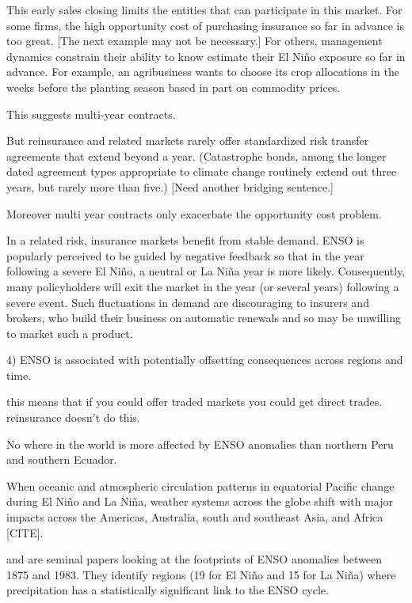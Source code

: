 \documentclass[authoryear]{article}
\begin{document}
This early sales closing limits the entities that can participate in this market. For some firms, the high opportunity cost of purchasing insurance so far in advance is too great. [The next example may not be necessary.] For others, management dynamics constrain their ability to know estimate their El Ni\~no exposure so far in advance. For example, an agribusiness wants to choose its crop allocations in the weeks before the planting season based in part on commodity prices.


This suggests multi-year contracts. 

But reinsurance and related markets rarely offer standardized risk transfer agreements that extend beyond a year. (Catastrophe bonds, among the longer dated agreement types appropriate to climate change routinely extend out three years, but rarely more than five.) [Need another bridging sentence.] 

Moreover multi year contracts only exacerbate the opportunity cost problem.


In a related risk, insurance markets benefit from stable demand. ENSO is popularly perceived to be guided by negative feedback so that in the year following a severe El Ni\~no, a neutral or La Ni\~na year is more likely. Consequently, many policyholders will exit the market in the year (or several years) following a severe event. Such fluctuations in demand are discouraging to insurers and brokers, who build their business on automatic renewals and so may be unwilling to market such a product.

4) ENSO is associated with potentially offsetting consequences across regions and time. 

this means that if you could offer traded markets you could get direct trades. reinsurance doesn't do this. 

No where in the world is more affected by ENSO anomalies than northern Peru and southern Ecuador.

When oceanic and atmospheric circulation patterns in equatorial Pacific change during El Ni\~no and La Ni\~na, weather systems across the globe shift with major impacts across the Americas, Australia, south and southeast Asia, and Africa [CITE].

\citet{ropelewski1987global} and \citet{ropelewski1989precipitation} are seminal papers looking at the footprints of ENSO anomalies between 1875 and 1983. They identify regions (19 for El Ni\~no and 15 for La Ni\~na) where precipitation has a statistically significant link to the ENSO cycle.
\end{document}
